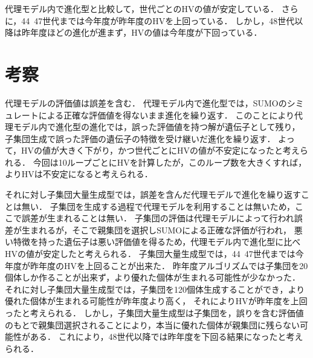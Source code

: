 \documentclass[main]{subfiles}
\begin{document}
        代理モデル内で進化型と比較して，世代ごとのHVの値が安定している．
        さらに，44~47世代までは今年度が昨年度のHVを上回っている．
        しかし，48世代以降は昨年度ほどの進化が進まず，HVの値は今年度が下回っている．

    \section{考察}
    代理モデルの評価値は誤差を含む．
    代理モデル内で進化型では，SUMOのシミュレートによる正確な評価値を得ないまま進化を繰り返す．
    このことにより代理モデル内で進化型の進化では，誤った評価値を持つ解が遺伝子として残り，
    子集団生成で誤った評価の遺伝子の特徴を受け継いだ進化を繰り返す．
    よって，HVの値が大きく下がり，かつ世代ごとにHVの値が不安定になったと考えられる．
    今回は10ループごとにHVを計算したが，このループ数を大きくすれば，よりHVは不安定になると考えられる．

    それに対し子集団大量生成型では，誤差を含んだ代理モデルで進化を繰り返すことは無い．
    子集団を生成する過程で代理モデルを利用することは無いため，ここで誤差が生まれることは無い．
    子集団の評価は代理モデルによって行われ誤差が生まれるが，そこで親集団を選択しSUMOによる正確な評価が行われ，
    悪い特徴を持った遺伝子は悪い評価値を得るため，代理モデル内で進化型に比べHVの値が安定したと考えられる．
    子集団大量生成型では，44~47世代までは今年度が昨年度のHVを上回ることが出来た．
    昨年度アルゴリズムでは子集団を20個体しか作ることが出来ず，より優れた個体が生まれる可能性が少なかった．
    それに対し子集団大量生成型では，子集団を120個体生成することができ，より優れた個体が生まれる可能性が昨年度より高く，
    それによりHVが昨年度を上回ったと考えられる．
    しかし，子集団大量生成型は子集団を，誤りを含む評価値のもとで親集団選択されることにより，本当に優れた個体が親集団に残らない可能性がある．
    これにより，48世代以降では昨年度を下回る結果になったと考えられる．



    
\end{document}
